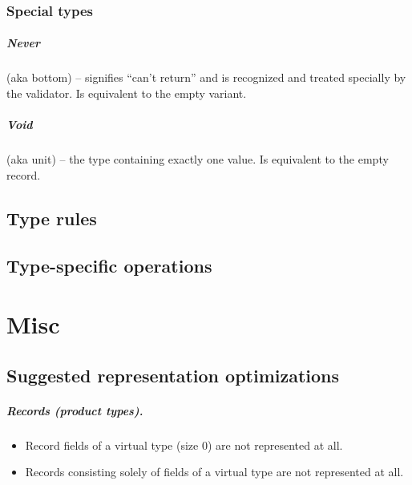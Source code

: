 \documentclass[a4paper]{report}
\begin{document}
\subsection{Special types}

\paragraph{Never} (aka bottom) -- signifies ``can't return'' and is
recognized and treated specially by the validator.
Is equivalent to the empty variant.

\paragraph{Void} (aka unit) -- the type containing exactly one value.
Is equivalent to the empty record.

\section{Type rules}

\section{Type-specific operations}



\chapter{Misc}

\section{Suggested representation optimizations}

\paragraph{Records (product types).}
\begin{itemize}
\item Record fields of a virtual type (size 0) are not represented at all.
\item Records consisting solely of fields of a virtual type are not represented at all.
\end{itemize}
\end{document}
